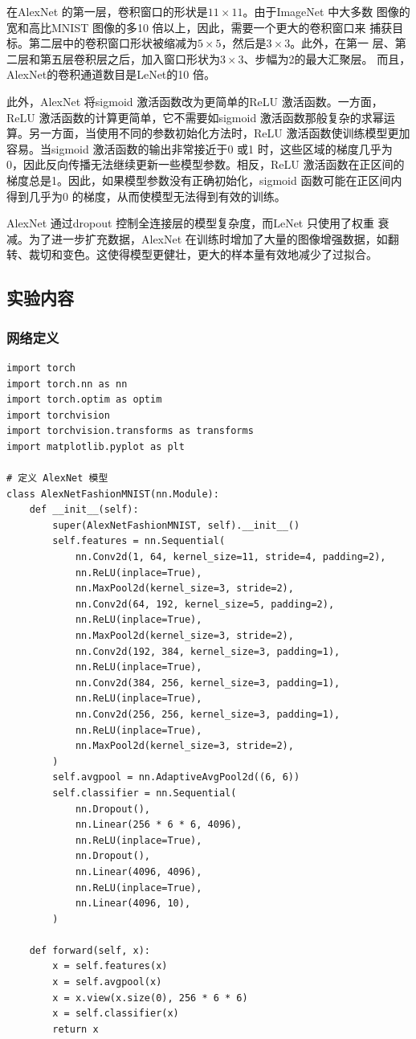 \documentclass[a4paper,12pt]{article}
\begin{document}
在AlexNet 的第一层，卷积窗口的形状是$11 \times 11$。由于ImageNet 中大多数
图像的宽和高比MNIST 图像的多10 倍以上，因此，需要一个更大的卷积窗口来
捕获目标。第二层中的卷积窗口形状被缩减为$5 \times 5$，然后是$3 \times 3$。此外，在第一
层、第二层和第五层卷积层之后，加入窗口形状为$3 \times 3$、步幅为2的最大汇聚层。
而且，AlexNet的卷积通道数目是LeNet的10 倍。

此外，AlexNet 将sigmoid 激活函数改为更简单的ReLU 激活函数。一方面，
ReLU 激活函数的计算更简单，它不需要如sigmoid 激活函数那般复杂的求幂运
算。另一方面，当使用不同的参数初始化方法时，ReLU 激活函数使训练模型更加
容易。当sigmoid 激活函数的输出非常接近于0 或1 时，这些区域的梯度几乎为
0，因此反向传播无法继续更新一些模型参数。相反，ReLU 激活函数在正区间的
梯度总是1。因此，如果模型参数没有正确初始化，sigmoid 函数可能在正区间内
得到几乎为0 的梯度，从而使模型无法得到有效的训练。

AlexNet 通过dropout 控制全连接层的模型复杂度，而LeNet 只使用了权重
衰减。为了进一步扩充数据，AlexNet 在训练时增加了大量的图像增强数据，如翻
转、裁切和变色。这使得模型更健壮，更大的样本量有效地减少了过拟合。

\subsection{实验内容}
\subsubsection{网络定义}
\begin{lstlisting}
import torch
import torch.nn as nn
import torch.optim as optim
import torchvision
import torchvision.transforms as transforms
import matplotlib.pyplot as plt

# 定义 AlexNet 模型
class AlexNetFashionMNIST(nn.Module):
    def __init__(self):
        super(AlexNetFashionMNIST, self).__init__()
        self.features = nn.Sequential(
            nn.Conv2d(1, 64, kernel_size=11, stride=4, padding=2),
            nn.ReLU(inplace=True),
            nn.MaxPool2d(kernel_size=3, stride=2),
            nn.Conv2d(64, 192, kernel_size=5, padding=2),
            nn.ReLU(inplace=True),
            nn.MaxPool2d(kernel_size=3, stride=2),
            nn.Conv2d(192, 384, kernel_size=3, padding=1),
            nn.ReLU(inplace=True),
            nn.Conv2d(384, 256, kernel_size=3, padding=1),
            nn.ReLU(inplace=True),
            nn.Conv2d(256, 256, kernel_size=3, padding=1),
            nn.ReLU(inplace=True),
            nn.MaxPool2d(kernel_size=3, stride=2),
        )
        self.avgpool = nn.AdaptiveAvgPool2d((6, 6))
        self.classifier = nn.Sequential(
            nn.Dropout(),
            nn.Linear(256 * 6 * 6, 4096),
            nn.ReLU(inplace=True),
            nn.Dropout(),
            nn.Linear(4096, 4096),
            nn.ReLU(inplace=True),
            nn.Linear(4096, 10),
        )

    def forward(self, x):
        x = self.features(x)
        x = self.avgpool(x)
        x = x.view(x.size(0), 256 * 6 * 6)
        x = self.classifier(x)
        return x

\end{lstlisting}
\end{document}
